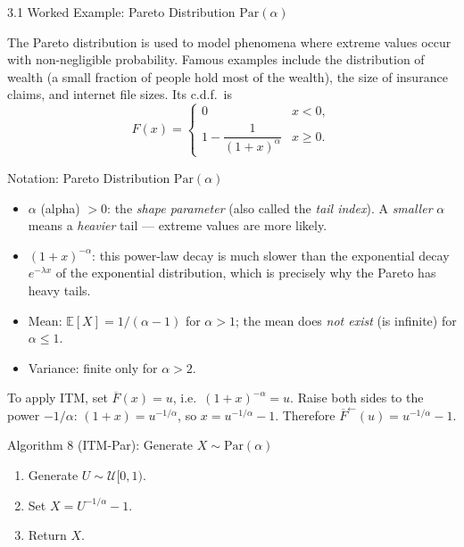 \documentclass[aspectratio=169,10pt]{beamer}
\newcommand{\EE}{\mathbb{E}}
\newcommand{\UU}{\mathcal{U}}
\begin{document}
\begin{frame}[allowframebreaks]{3.1 Worked Example: Pareto Distribution $\mathrm{Par}(\alpha)$}

The Pareto distribution is used to model phenomena where extreme values occur
with non-negligible probability.  Famous examples include the distribution of
wealth (a small fraction of people hold most of the wealth), the size of
insurance claims, and internet file sizes.  Its c.d.f.\ is
\[
  F(x) = \begin{cases} 0 & x < 0, \\ 1 - \dfrac{1}{(1+x)^{\alpha}} & x \ge 0. \end{cases}
\]

\begin{block}{Notation: Pareto Distribution $\mathrm{Par}(\alpha)$}
  \begin{itemize}
    \item $\alpha$ (alpha) $> 0$: the \emph{shape parameter} (also called
      the \emph{tail index}).  A \emph{smaller} $\alpha$ means a \emph{heavier}
      tail --- extreme values are more likely.
    \item $(1+x)^{-\alpha}$: this power-law decay is much slower than the
      exponential decay $e^{-\lambda x}$ of the exponential distribution, which
      is precisely why the Pareto has heavy tails.
    \item Mean: $\EE[X] = 1/(\alpha - 1)$ for $\alpha > 1$; the mean does
      \emph{not exist} (is infinite) for $\alpha \le 1$.
    \item Variance: finite only for $\alpha > 2$.
  \end{itemize}
\end{block}

To apply ITM, set $\overline{F}(x) = u$, i.e.\ $(1+x)^{-\alpha} = u$.
Raise both sides to the power $-1/\alpha$: $(1+x) = u^{-1/\alpha}$,
so $x = u^{-1/\alpha} - 1$.  Therefore $\overline{F}^{\leftarrow}(u) = u^{-1/\alpha} - 1$.

\begin{block}{Algorithm 8 (ITM-Par): Generate $X \sim \mathrm{Par}(\alpha)$}
  \begin{enumerate}
    \item Generate $U \sim \UU[0,1)$.
    \item Set $X = U^{-1/\alpha} - 1$.
    \item Return $X$.
  \end{enumerate}
\end{block}


\end{frame}
\end{document}
